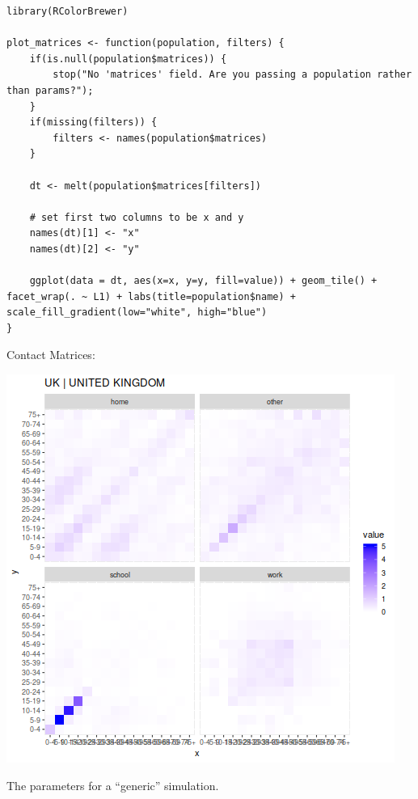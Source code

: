 \documentclass[11pt]{article}
\begin{document}
\begin{verbatim}
library(RColorBrewer)

plot_matrices <- function(population, filters) {
    if(is.null(population$matrices)) {
        stop("No 'matrices' field. Are you passing a population rather than params?");
    }
    if(missing(filters)) {
        filters <- names(population$matrices)
    }
    
    dt <- melt(population$matrices[filters])

    # set first two columns to be x and y
    names(dt)[1] <- "x"
    names(dt)[2] <- "y"

    ggplot(data = dt, aes(x=x, y=y, fill=value)) + geom_tile() + facet_wrap(. ~ L1) + labs(title=population$name) +  scale_fill_gradient(low="white", high="blue")
} 
\end{verbatim}

Contact Matrices:
\begin{center}
\includegraphics[width=.9\linewidth]{1-home.png}
\end{center}

The parameters for a ``generic'' simulation.
\end{document}

